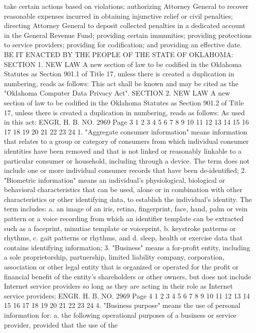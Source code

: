 take certain actions based on violations; authorizing
Attorney General to recover reasonable expenses
incurred in obtaining injunctive relief or civil
penalties; directing Attorney General to deposit
collected penalties in a dedicated account in the
General Revenue Fund; providing certain immunities;
providing protections to service providers; providing
for codification; and providing an effective date.
BE IT ENACTED BY THE PEOPLE OF THE STATE OF OKLAHOMA:
SECTION 1. NEW LAW A new section of law to be codified
in the Oklahoma Statutes as Section 901.1 of Title 17, unless there
is created a duplication in numbering, reads as follows:
This act shall be known and may be cited as the "Oklahoma
Computer Data Privacy Act".
SECTION 2. NEW LAW A new section of law to be codified
in the Oklahoma Statutes as Section 901.2 of Title 17, unless there
is created a duplication in numbering, reads as follows:
As used in this act:
ENGR. H. B. NO. 2969 Page 3
1
2
3
4
5
6
7
8
9
10
11
12
13
14
15
16
17
18
19
20
21
22
23
24
1. "Aggregate consumer information" means information that
relates to a group or category of consumers from which individual
consumer identities have been removed and that is not linked or
reasonably linkable to a particular consumer or household, including
through a device. The term does not include one or more individual
consumer records that have been de-identified;
2. "Biometric information" means an individual's physiological,
biological or behavioral characteristics that can be used, alone or
in combination with other characteristics or other identifying data,
to establish the individual's identity. The term includes:
a. an image of an iris, retina, fingerprint, face, hand,
palm or vein pattern or a voice recording from which
an identifier template can be extracted such as a
faceprint, minutiae template or voiceprint,
b. keystroke patterns or rhythms,
c. gait patterns or rhythms, and
d. sleep, health or exercise data that contains
identifying information;
3. "Business" means a for-profit entity, including a sole
proprietorship, partnership, limited liability company, corporation,
association or other legal entity that is organized or operated for
the profit or financial benefit of the entity's shareholders or
other owners, but does not include Internet service providers so
long as they are acting in their role as Internet service providers;
ENGR. H. B. NO. 2969 Page 4
1
2
3
4
5
6
7
8
9
10
11
12
13
14
15
16
17
18
19
20
21
22
23
24
4. "Business purpose" means the use of personal information
for:
a. the following operational purposes of a business or
service provider, provided that the use of the
